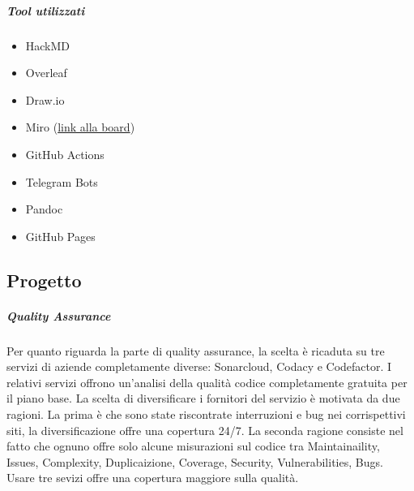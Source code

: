         \subparagraph{Tool utilizzati}
        \begin{itemize}
            \item HackMD
            \item Overleaf
            \item Draw.io
            \item Miro (\href{https://miro.com/app/board/o9J_lEyTG7Q=/}{link alla board})
            \item GitHub Actions
            \item Telegram Bots
            \item Pandoc
            \item GitHub Pages
        \end{itemize}

    \subsection{Progetto}

        
        \subparagraph{Quality Assurance}
        Per quanto riguarda la parte di quality assurance, la scelta è ricaduta su tre servizi di aziende completamente diverse: Sonarcloud, Codacy e Codefactor. I relativi servizi offrono un'analisi della qualità codice completamente gratuita per il piano base. La scelta di diversificare i fornitori del servizio è motivata da due ragioni. La prima è che sono state riscontrate interruzioni e bug nei corrispettivi siti, la diversificazione offre una copertura 24/7. La seconda ragione consiste nel fatto che ognuno offre solo alcune misurazioni sul codice tra Maintainaility, Issues, Complexity, Duplicaizione, Coverage, Security, Vulnerabilities, Bugs. Usare tre sevizi offre una copertura maggiore sulla qualità.

